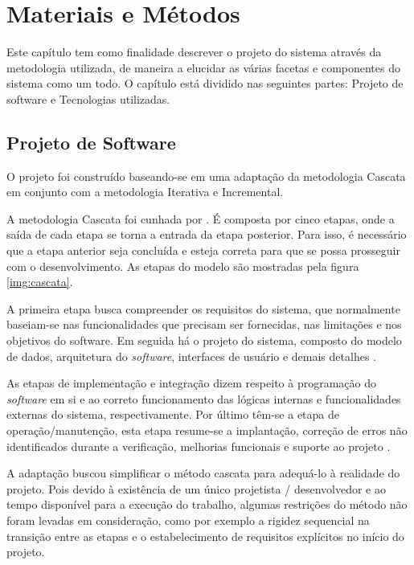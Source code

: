 \chapter{Materiais e Métodos} \label{ch:MM}

Este capítulo tem como finalidade descrever o projeto do sistema através da metodologia utilizada, de maneira a elucidar as várias facetas e componentes do sistema como um todo. O capítulo está dividido nas seguintes partes: Projeto de software e Tecnologias utilizadas.

\section{Projeto de Software} 

O projeto foi construído baseando-se em uma adaptação da metodologia Cascata em conjunto com a metodologia Iterativa e Incremental.

A metodologia Cascata foi cunhada por . É composta por cinco etapas, onde a saída de cada etapa se torna a entrada da etapa posterior. Para isso, é necessário que a etapa anterior seja concluída e esteja correta para que se possa prosseguir com o desenvolvimento. As etapas do modelo são mostradas pela figura \ref{img:cascata}.


A primeira etapa busca compreender os requisitos do sistema, que normalmente baseiam-se nas funcionalidades que precisam ser fornecidas, nas limitações e nos objetivos do software. Em seguida há o projeto do sistema, composto do modelo de dados, arquitetura do \textit{software}, interfaces de usuário e demais detalhes \cite{SITECASCATA1, SITECASCATA2}.

As etapas de implementação e integração dizem respeito à programação do \textit{software} em si e ao correto funcionamento das lógicas internas e funcionalidades externas do sistema, respectivamente. Por último têm-se a etapa de operação/manutenção, esta etapa resume-se a implantação, correção de erros não identificados durante a verificação, melhorias funcionais e suporte ao projeto \cite{SITECASCATA1, SITECASCATA2}.

A adaptação buscou simplificar o método cascata para adequá-lo à realidade do projeto. Pois devido à existência de um único projetista / desenvolvedor e ao tempo disponível para a execução do trabalho, algumas restrições do método não foram levadas em consideração, como por exemplo a rigidez sequencial na transição entre as etapas e o estabelecimento de requisitos explícitos no início do projeto.

